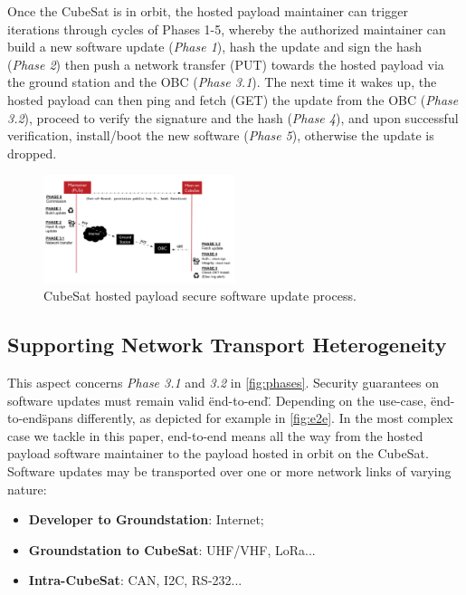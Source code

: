 Once the CubeSat is in orbit, the hosted payload maintainer can trigger iterations through cycles of Phases 1-5, whereby
the authorized maintainer can build a new software update (\textit{Phase 1}), hash the update
and sign the hash (\textit{Phase 2}) then push a network transfer (PUT) towards the hosted payload
via the ground station and the OBC (\textit{Phase 3.1}). The next time it wakes up, the hosted payload can
then ping and fetch (GET) the update from the OBC (\textit{Phase 3.2}), proceed to verify the signature and the hash (\textit{Phase 4}),
and upon successful verification, install/boot the new software (\textit{Phase 5}), otherwise the update is dropped.

\begin{figure}[t]
    \centering
    \includegraphics[width=0.5\textwidth]{Figures/CubeSat-Payload-update.png}
    \caption{CubeSat hosted payload secure software update process.}
    \label{fig:phases}
\end{figure}

\subsection{Supporting Network Transport Heterogeneity}
This aspect concerns \textit{Phase 3.1} and \textit{3.2} in \autoref{fig:phases}. Security guarantees on
software updates must remain valid \"end-to-end\". Depending on the use-case, \"end-to-end\" spans differently,
as depicted for example in \autoref{fig:e2e}. In the most complex case we tackle in this paper,
end-to-end means all the way from the hosted payload software maintainer to the payload hosted in orbit on the CubeSat.
Software updates may be transported over one or more network links of varying nature:
\begin{itemize}
\item {\bf Developer to Groundstation}: Internet;
\item {\bf Groundstation to CubeSat}: UHF/VHF, LoRa...
\item {\bf Intra-CubeSat}: CAN, I2C, RS-232...
\end{itemize}

